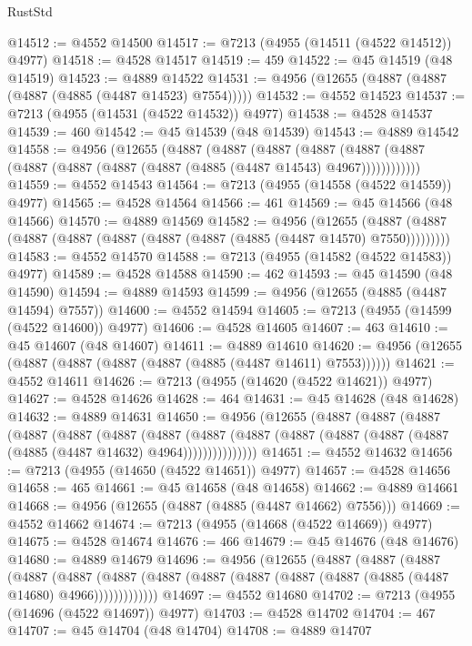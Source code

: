 \begin{lexlean}{RustStd}
\begin{coremodule}
@14512 := @4552 @14500
@14517 := @7213 (@4955 (@14511 (@4522 @14512)) @4977)
@14518 := @4528 @14517
@14519 := 459
@14522 := @45 @14519 (@48 @14519)
@14523 := @4889 @14522
@14531 := @4956 (@12655 (@4887 (@4887 (@4887 (@4885 (@4487 @14523) @7554)))))
@14532 := @4552 @14523
@14537 := @7213 (@4955 (@14531 (@4522 @14532)) @4977)
@14538 := @4528 @14537
@14539 := 460
@14542 := @45 @14539 (@48 @14539)
@14543 := @4889 @14542
@14558 := @4956
    (@12655
      (@4887
        (@4887
          (@4887
            (@4887 (@4887 (@4887 (@4887 (@4887 (@4887 (@4887 (@4885 (@4487 @14543) @4967))))))))))))
@14559 := @4552 @14543
@14564 := @7213 (@4955 (@14558 (@4522 @14559)) @4977)
@14565 := @4528 @14564
@14566 := 461
@14569 := @45 @14566 (@48 @14566)
@14570 := @4889 @14569
@14582 := @4956
    (@12655 (@4887 (@4887 (@4887 (@4887 (@4887 (@4887 (@4887 (@4885 (@4487 @14570) @7550)))))))))
@14583 := @4552 @14570
@14588 := @7213 (@4955 (@14582 (@4522 @14583)) @4977)
@14589 := @4528 @14588
@14590 := 462
@14593 := @45 @14590 (@48 @14590)
@14594 := @4889 @14593
@14599 := @4956 (@12655 (@4885 (@4487 @14594) @7557))
@14600 := @4552 @14594
@14605 := @7213 (@4955 (@14599 (@4522 @14600)) @4977)
@14606 := @4528 @14605
@14607 := 463
@14610 := @45 @14607 (@48 @14607)
@14611 := @4889 @14610
@14620 := @4956 (@12655 (@4887 (@4887 (@4887 (@4887 (@4885 (@4487 @14611) @7553))))))
@14621 := @4552 @14611
@14626 := @7213 (@4955 (@14620 (@4522 @14621)) @4977)
@14627 := @4528 @14626
@14628 := 464
@14631 := @45 @14628 (@48 @14628)
@14632 := @4889 @14631
@14650 := @4956
    (@12655
      (@4887
        (@4887
          (@4887
            (@4887
              (@4887
                (@4887
                  (@4887
                    (@4887
                      (@4887 (@4887 (@4887 (@4887 (@4887 (@4885 (@4487 @14632) @4964)))))))))))))))
@14651 := @4552 @14632
@14656 := @7213 (@4955 (@14650 (@4522 @14651)) @4977)
@14657 := @4528 @14656
@14658 := 465
@14661 := @45 @14658 (@48 @14658)
@14662 := @4889 @14661
@14668 := @4956 (@12655 (@4887 (@4885 (@4487 @14662) @7556)))
@14669 := @4552 @14662
@14674 := @7213 (@4955 (@14668 (@4522 @14669)) @4977)
@14675 := @4528 @14674
@14676 := 466
@14679 := @45 @14676 (@48 @14676)
@14680 := @4889 @14679
@14696 := @4956
    (@12655
      (@4887
        (@4887
          (@4887
            (@4887
              (@4887
                (@4887 (@4887 (@4887 (@4887 (@4887 (@4887 (@4885 (@4487 @14680) @4966)))))))))))))
@14697 := @4552 @14680
@14702 := @7213 (@4955 (@14696 (@4522 @14697)) @4977)
@14703 := @4528 @14702
@14704 := 467
@14707 := @45 @14704 (@48 @14704)
@14708 := @4889 @14707

\end{coremodule}
\end{lexlean}

